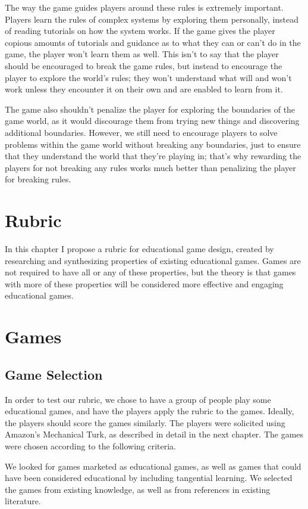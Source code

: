 \documentclass[12pt]{report}
\begin{document}
		The way the game guides players around these rules is extremely important. Players learn the rules of complex systems by exploring them personally, instead of reading tutorials on how the system works.  If the game gives the player copious amounts of tutorials and guidance as to what they can or can't do in the game, the player won't learn them as well. This isn't to say that the player should be encouraged to break the game rules, but instead to encourage the player to explore the world's rules; they won't understand what will and won't work unless they encounter it on their own and are enabled to learn from it.
	
		The game also shouldn't penalize the player for exploring the boundaries of the game world, as it would discourage them from trying new things and discovering additional boundaries. However, we still need to encourage players to solve problems within the game world without breaking any boundaries, just to ensure that they understand the world that they're playing in; that's why rewarding the players for not breaking any rules works much better than penalizing the player for breaking rules.

\chapter{Rubric}
	In this chapter I propose a rubric for educational game design, created by researching and synthesizing properties of existing educational games. Games are not required to have all or any of these properties, but the theory is that games with more of these properties will be considered more effective and engaging educational games.



\chapter{Games}
	\section{Game Selection}
		In order to test our rubric, we chose to have a group of people play some educational games, and have the players apply the rubric to the games.  Ideally, the players should score the games similarly.  The players were solicited using Amazon's Mechanical Turk, as described in detail in the next chapter.  The games were chosen according to the following criteria.

		 We looked for games marketed as educational games, as well as games that could have been considered educational by including tangential learning. We selected the games from existing knowledge, as well as from references in existing literature.
\end{document}
